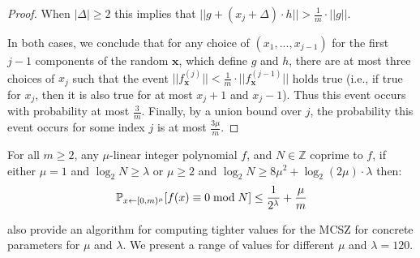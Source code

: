 \begin{proof}
When $|\Delta| \geq 2$ this implies that $||g + (x_j + \Delta) \cdot h|| > \frac{1}{m} \cdot ||g||$.  

In both cases, we conclude that for any choice of $(x_1,...,x_{j-1})$ for the first $j-1$ components of the random $\mathbf{x}$, which define $g$ and $h$, there are at most three choices of $x_j$ such that the event $||f_{\mathbf{x}}^{(j)}|| < \frac{1}{m} \cdot ||f_{\mathbf{x}}^{(j-1)}||$ holds true  (i.e., if true for $x_j$, then it is also true for at most $x_j + 1$ and $x_j - 1$). Thus this event occurs with probability at most $\frac{3}{m}$. Finally, by a union bound over $j$, the probability this event occurs for some index $j$ is at most $\frac{3\mu}{m}$. 


 \end{proof}

 
 \begin{lemma}\label{lem:CSZ}
 For all $m \geq 2$, any $\mu$-linear integer polynomial $f$, and $N \in \mathbb{Z}$ coprime to $f$, if either $\mu = 1$ and $ \log_2 N \geq \lambda$ or $\mu \geq 2$ and $\log_2 N\geq 8 \mu^2 + \log_2(2\mu)\cdot \lambda$ then:
 $$\mathbb{P}_{x\gets [0,m)^\mu} [f(x)\equiv 0 \bmod N]\leq \frac{1}{2^{\lambda}} + \frac{\mu}{m}$$
 \end{lemma} 
\cite{EPRINT:BunFis22} also provide an algorithm for computing tighter values for the MCSZ for concrete parameters for $\mu$ and $\lambda$. We present a range of values for different $\mu$ and $\lambda=120$.
